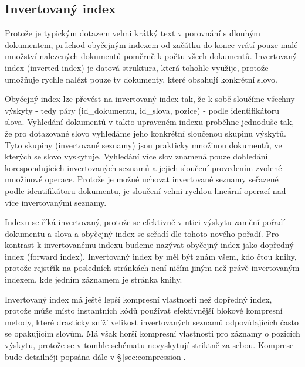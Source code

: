 \documentclass[11pt,letterpaper,oneside,openright]{book}
\begin{document}

\subsection{Invertovaný index} \label{sec:inverted_index}
Protože je typickým dotazem velmi krátký text v porovnání s dlouhým dokumentem,
průchod obyčejným indexem od začátku do konce vrátí pouze malé množství
nalezených dokumentů poměrně k počtu všech dokumentů. Invertovaný index
(inverted index) je datová struktura, která tohohle využije, protože umožňuje
rychle nalézt pouze ty dokumenty, které obsahují konkrétní slovo.

Obyčejný index lze převést na invertovaný index tak, že k sobě sloučíme všechny
výskyty - tedy páry (id\_dokumentu, id\_slova, pozice) - podle identifikátoru
slova. Vyhledání dokumentů v takto upraveném indexu proběhne jednoduše tak, že
pro dotazované slovo vyhledáme jeho konkrétní sloučenou skupinu výskytů. Tyto
skupiny (invertované seznamy) jsou prakticky množinou dokumentů, ve kterých se
slovo vyskytuje. Vyhledání více slov znamená pouze dohledání korespondujících
invertovaných seznamů a jejich sloučení provedením zvolené množinové operace.
Protože je možné uchovat invertované seznamy seřazené podle identifikátoru
dokumentu, je sloučení velmi rychlou lineární operací nad více invertovanými
seznamy.

Indexu se říká invertovaný, protože se efektivně v ntici výskytu zamění pořadí
dokumentu a slova a obyčejný index se seřadí dle tohoto nového pořadí. Pro
kontrast k invertovanému indexu budeme nazývat obyčejný index jako dopředný
index (forward index). Invertovaný index by měl být znám všem, kdo čtou knihy,
protože rejstřík na posledních stránkách není ničím jiným než právě
invertovaným indexem, kde jedním záznamem je stránka knihy.

Invertovaný index má ještě lepší kompresní vlastnosti než dopředný index,
protože může místo instantních kódů používat efektivnější blokové kompresní
metody, které drasticky sníží velikost invertovaných seznamů odpovídajících
často se opakujícím slovům. Má však horší kompresní vlastnosti pro záznamy o
pozicích výskytu, protože se v tomhle schématu nevyskytují striktně za sebou.
Komprese bude detailněji popsána dále v \S\,\ref{sec:compression}.
\end{document}
